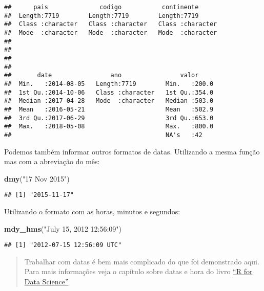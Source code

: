 \documentclass[]{book}
\newenvironment{Shaded}{\begin{snugshade}}{\end{snugshade}}
\newcommand{\KeywordTok}[1]{\textcolor[rgb]{0.13,0.29,0.53}{\textbf{#1}}}
\newcommand{\NormalTok}[1]{#1}
\newcommand{\StringTok}[1]{\textcolor[rgb]{0.31,0.60,0.02}{#1}}
\theoremstyle{definition}
\theoremstyle{definition}
\theoremstyle{definition}
\theoremstyle{remark}
\begin{document}
\begin{verbatim}
##      pais              codigo           continente       
##  Length:7719        Length:7719        Length:7719       
##  Class :character   Class :character   Class :character  
##  Mode  :character   Mode  :character   Mode  :character  
##                                                          
##                                                          
##                                                          
##                                                          
##       date                ano                valor      
##  Min.   :2014-08-05   Length:7719        Min.   :200.0  
##  1st Qu.:2014-10-06   Class :character   1st Qu.:354.0  
##  Median :2017-04-28   Mode  :character   Median :503.0  
##  Mean   :2016-05-21                      Mean   :502.9  
##  3rd Qu.:2017-06-29                      3rd Qu.:653.0  
##  Max.   :2018-05-08                      Max.   :800.0  
##                                          NA's   :42
\end{verbatim}

Podemos também informar outros formatos de datas. Utilizando a mesma função mas com a abreviação do mês:

\begin{Shaded}
\begin{Highlighting}[]
\KeywordTok{dmy}\NormalTok{(}\StringTok{"17 Nov 2015"}\NormalTok{)}
\end{Highlighting}
\end{Shaded}

\begin{verbatim}
## [1] "2015-11-17"
\end{verbatim}

Utilizando o formato com as horas, minutos e segundos:

\begin{Shaded}
\begin{Highlighting}[]
\KeywordTok{mdy_hms}\NormalTok{(}\StringTok{"July 15, 2012 12:56:09"}\NormalTok{)}
\end{Highlighting}
\end{Shaded}

\begin{verbatim}
## [1] "2012-07-15 12:56:09 UTC"
\end{verbatim}

\begin{quote}
Trabalhar com datas é bem mais complicado do que foi demonstrado aqui. Para mais informações veja o capítulo sobre datas e hora do livro \href{https://r4ds.had.co.nz/dates-and-times.html}{``R for Data Science''}
\end{quote}
\end{document}
